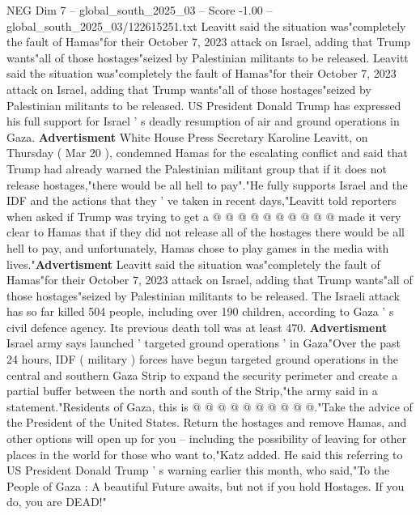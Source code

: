 \begin{textsample}{NEG Dim 7 – global\_south\_2025\_03 – Score -1.00 – global\_south\_2025\_03/122615251.txt}  \label{ex:f7_neg_030}
Leavitt said the situation was"completely the fault of Hamas"for their October 7, 2023 attack on Israel, adding that Trump wants"all of those hostages"seized by Palestinian militants to be released.
Leavitt said the situation was"completely the fault of Hamas"for their October 7, 2023 attack on Israel, adding that Trump wants"all of those hostages"seized by Palestinian militants to be released.
US President Donald Trump has expressed his full support for Israel ' s deadly resumption of air and ground operations in Gaza. \textbf{Advertisment} White House Press Secretary Karoline Leavitt, on Thursday ( Mar 20 ), condemned Hamas for the escalating conflict and said that Trump had already warned the Palestinian militant group that if it does not release hostages,"there would be all hell to pay"."He fully supports Israel and the IDF and the actions that they ' ve taken in recent days,"Leavitt told reporters when asked if Trump was trying to get a @ @ @ @ @ @ @ @ @ @ made it very clear to Hamas that if they did not release all of the hostages there would be all hell to pay, and unfortunately, Hamas chose to play games in the media with lives."\textbf{Advertisment} Leavitt said the situation was"completely the fault of Hamas"for their October 7, 2023 attack on Israel, adding that Trump wants"all of those hostages"seized by Palestinian militants to be released.
The Israeli attack has so far killed 504 people, including over 190 children, according to Gaza ' s civil defence agency.
Its previous death toll was at least 470. \textbf{Advertisment} Israel army says launched ' targeted ground operations ' in Gaza"Over the past 24 hours, IDF ( military ) forces have begun targeted ground operations in the central and southern Gaza Strip to expand the security perimeter and create a partial buffer between the north and south of the Strip,"the army said in a statement."Residents of Gaza, this is @ @ @ @ @ @ @ @ @ @."Take the advice of the President of the United States.
Return the hostages and remove Hamas, and other options will open up for you -- including the possibility of leaving for other places in the world for those who want to,"Katz added.
He said this referring to US President Donald Trump ' s warning earlier this month, who said,"To the People of Gaza : A beautiful Future awaits, but not if you hold Hostages.
If you do, you are DEAD!"

\end{textsample}

